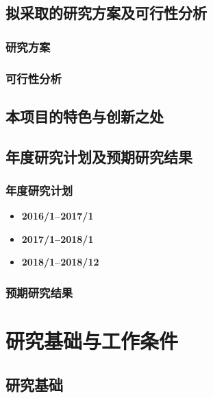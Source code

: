 \documentclass[a4paper,11pt]{article}
\begin{document}
\subsection{拟采取的研究方案及可行性分析}
\subsubsection{研究方案}


\subsubsection{可行性分析}



\subsection{本项目的特色与创新之处}


\subsection{年度研究计划及预期研究结果}

\subsubsection{年度研究计划}


\begin{itemize}
\item [] \textbf{2016/1--2017/1}

\item [] \textbf{2017/1--2018/1}

\item [] \textbf{2018/1--2018/12}

\end{itemize}
\subsubsection{预期研究结果}


\section{研究基础与工作条件}
\subsection{研究基础}
\end{document}
